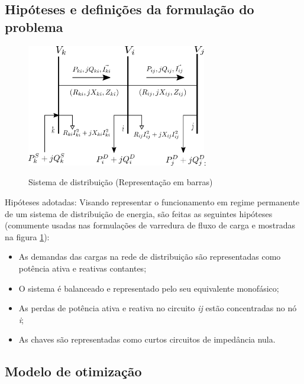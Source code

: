 \subsection{Hipóteses e definições da formulação do problema}

\begin{figure}[H]
    \centering
    \includegraphics[width=0.7\textwidth]{3_Methodology/diagrama_nos.png}:
    \caption{Sistema de distribuição (Representação em barras)}
    \label{fig:SDR}
\end{figure}

Hipóteses adotadas:
Visando representar o funcionamento em regime permanente de um sistema de distribuição de energia, são feitas as seguintes hipóteses (comumente usadas nas formulações de varredura de fluxo de carga \cite{Shirmohammadi1988ANetworks} e mostradas na figura \ref{fig:SDR}):

\begin{itemize}
    \item As demandas das cargas na rede de distribuição são representadas como potência ativa e reativas contantes;

    \item O sistema é balanceado e representado pelo seu equivalente monofásico;
    
    \item As perdas de potência ativa e reativa no circuito \textit{ij} estão concentradas no nó \textit{i};
    
    \item As chaves são representadas como curtos circuitos de impedância nula.
\end{itemize}

\subsection{Modelo de otimização}

